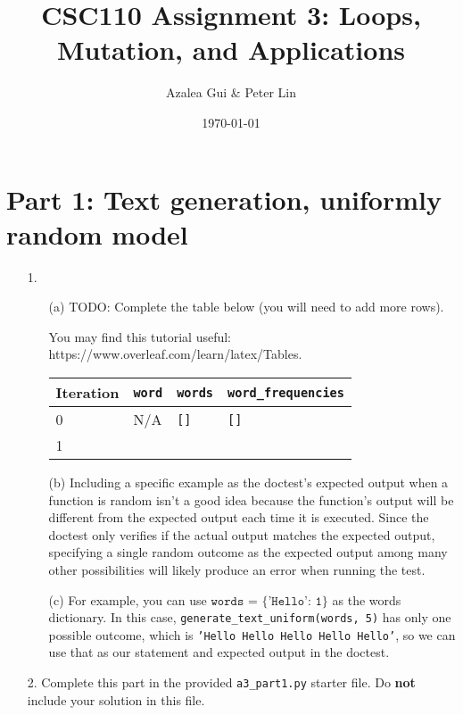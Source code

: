 \documentclass[fontsize=11pt]{article}
\title{CSC110 Assignment 3: Loops, Mutation, and Applications}
\author{Azalea Gui & Peter Lin}
\date{\today}
\begin{document}
\maketitle

\section*{Part 1: Text generation, uniformly random model}

\begin{enumerate}

\item[1.]
\begin{enumerate}
    \item[(a)]
    TODO: Complete the table below (you will need to add more rows).

    You may find this tutorial useful: https://www.overleaf.com/learn/latex/Tables.

    \begin{tabular}{|l|l|l|l|}
    \hline
    Iteration & \verb|word| & \verb|words| & \verb|word_frequencies|\\
    \hline
    0 & N/A & \texttt{[]} & \texttt{[]} \\
    1 & & & \\
    \hline
    \end{tabular}

    \item[(b)]
    Including a specific example as the doctest's expected output when a function is random isn't a good idea because the function's output will be different from the expected output each time it is executed. Since the doctest only verifies if the actual output matches the expected output, specifying a single random outcome as the expected output among many other possibilities will likely produce an error when running the test.

    \item[(c)]
    For example, you can use $\texttt{words = \{'Hello': 1\}}$ as the words dictionary. In this case, \texttt{generate\_text\_uniform(words, 5)} has only one possible outcome, which is \texttt{'Hello Hello Hello Hello Hello'}, so we can use that as our statement and expected output in the doctest.
\end{enumerate}

\item[2.]
Complete this part in the provided \texttt{a3\_part1.py} starter file.
Do \textbf{not} include your solution in this file.

\end{enumerate}
\end{document}
